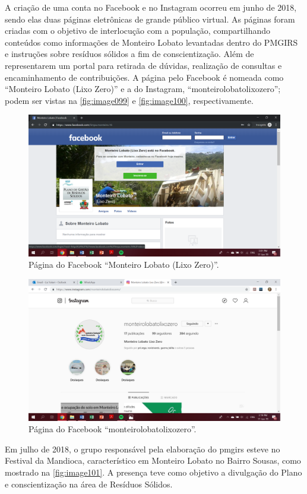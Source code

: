 A criação de uma conta no Facebook e no Instagram ocorreu em junho de 2018, sendo elas duas páginas eletrônicas de grande público virtual. As páginas foram criadas com o objetivo de interlocução com a população, compartilhando conteúdos como informações de Monteiro Lobato levantadas dentro do PMGIRS e instruções sobre resíduos sólidos a fim de conscientização. Além de representarem um portal para retirada de dúvidas, realização de consultas e encaminhamento de contribuições. A página pelo Facebook é nomeada como “Monteiro Lobato (Lixo Zero)” e a do Instagram, “monteirolobatolixozero”; podem ser vistas na \autoref{fig:image099} e \autoref{fig:image100}, respectivamente.

\begin{figure}
	\centering
	\includegraphics[width=0.75\linewidth]{produtos/prodtres/image099}
	\caption{Página do Facebook “Monteiro Lobato (Lixo Zero)”.}
	\label{fig:image099}
\end{figure}

\begin{figure}
	\centering
	\includegraphics[width=0.75\linewidth]{produtos/prodtres/image100}
	\caption{Página do Facebook “monteirolobatolixozero”.}
	\label{fig:image100}
\end{figure}

Em julho de 2018, o grupo responsável pela elaboração do \gls{pmgirs} esteve no Festival da Mandioca, característico em Monteiro Lobato no Bairro Sousas, como mostrado na \autoref{fig:image101}. A presença teve como objetivo a divulgação do Plano e conscientização na área de Resíduos Sólidos. 

